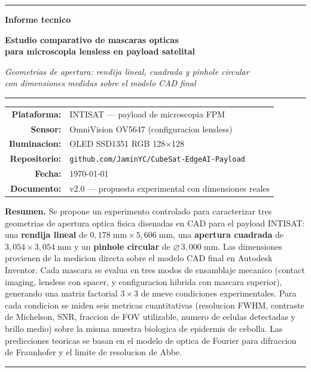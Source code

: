 \documentclass[11pt,a4paper,oneside]{report}
\begin{document}
\begin{titlepage}
\centering
\vspace*{1cm}
{\color{intisat}\rule{\textwidth}{2pt}}
\vspace{0.6cm}

{\Huge\bfseries\color{intisat} Informe tecnico}

\vspace{0.4cm}
{\LARGE\bfseries Estudio comparativo de mascaras opticas\\[0.2em]
para microscopia lensless en payload satelital}

\vspace{0.7cm}
{\Large\itshape Geometrias de apertura: rendija lineal, cuadrada y pinhole circular\\
con dimensiones medidas sobre el modelo CAD final}

\vspace{1cm}
{\color{intisataccent}\rule{0.6\textwidth}{1pt}}

\vspace{2cm}

\begin{tabular}{rl}
\textbf{Plataforma:} & INTISAT --- payload de microscopia FPM \\
\textbf{Sensor:} & OmniVision OV5647 (configuracion lensless) \\
\textbf{Iluminacion:} & OLED SSD1351 RGB 128$\times$128 \\
\textbf{Repositorio:} & \texttt{github.com/JaminYC/CubeSat-EdgeAI-Payload} \\
\textbf{Fecha:} & \today \\
\textbf{Documento:} & v2.0 --- propuesta experimental con dimensiones reales
\end{tabular}

\vfill

\begin{minipage}{0.85\textwidth}
\textbf{Resumen.}\quad
Se propone un experimento controlado para caracterizar tres geometrias de
apertura optica fisica disenadas en CAD para el payload INTISAT:
una \textbf{rendija lineal} de $0{,}178\;\mathrm{mm}\times 5{,}606\;\mathrm{mm}$,
una \textbf{apertura cuadrada} de $3{,}054\times 3{,}054\;\mathrm{mm}$ y un
\textbf{pinhole circular} de $\varnothing\,3{,}000\;\mathrm{mm}$.
Las dimensiones provienen de la medicion directa sobre el modelo CAD final
en Autodesk Inventor. Cada mascara se evalua en tres modos de ensamblaje
mecanico (contact imaging, lensless con spacer, y configuracion hibrida con
mascara superior), generando una matriz factorial $3\times 3$ de nueve
condiciones experimentales. Para cada condicion se miden seis metricas
cuantitativas (resolucion FWHM, contraste de Michelson, SNR, fraccion de
FOV utilizable, numero de celulas detectadas y brillo medio) sobre la misma
muestra biologica de epidermis de cebolla. Las predicciones teoricas se
basan en el modelo de optica de Fourier para difraccion de Fraunhofer y el
limite de resolucion de Abbe.
\end{minipage}

\vspace{1.2cm}
{\color{intisat}\rule{\textwidth}{2pt}}
\end{titlepage}
\end{document}
